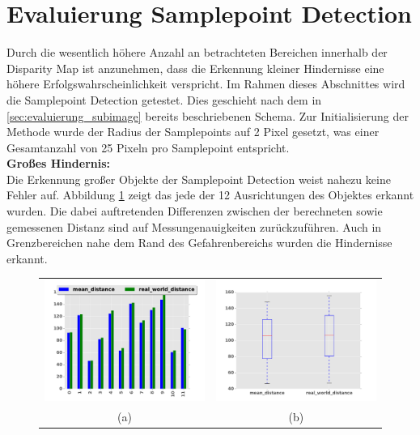 \section{Evaluierung Samplepoint Detection}
\label{sec:evaluierung_samplepoint}

\noindent
Durch die wesentlich höhere Anzahl an betrachteten Bereichen innerhalb der Disparity Map ist anzunehmen, dass die Erkennung kleiner Hindernisse eine höhere Erfolgswahrscheinlichkeit verspricht. Im Rahmen dieses Abschnittes wird die Samplepoint Detection getestet. Dies geschieht nach dem in \ref{sec:evaluierung_subimage} bereits beschriebenen Schema. Zur Initialisierung der Methode wurde der Radius der Samplepoints auf 2 Pixel gesetzt, was einer Gesamtanzahl von 25 Pixeln pro Samplepoint entspricht.\\

\noindent
\textbf{Großes Hindernis:}\\
Die Erkennung großer Objekte der Samplepoint Detection weist nahezu keine Fehler auf. Abbildung \ref{fig:sample_eval_big} zeigt das jede der 12 Ausrichtungen des Objektes erkannt wurden. Die dabei auftretenden Differenzen zwischen der berechneten sowie gemessenen Distanz sind auf Messungenauigkeiten zurückzuführen. Auch in Grenzbereichen nahe dem Rand des Gefahrenbereichs wurden die Hindernisse erkannt. 

\begin{figure}[h]
	\centering
	\begin{tabular}{cc}
	\includegraphics[width=7cm]{img/evaluation/diagrams/sample_big_bar}&
	\includegraphics[width=7cm]{img/evaluation/diagrams/sample_big_box}\\
	 (a) & (b)
	\end{tabular}
	\caption{}
    \label{fig:sample_eval_big}
\end{figure}


